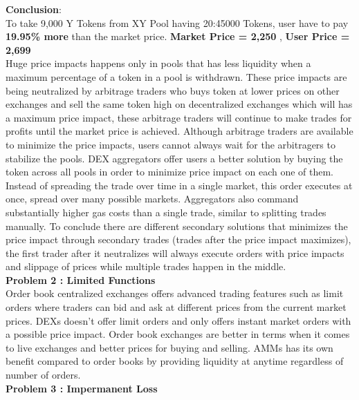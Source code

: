 \documentclass[conference]{IEEEtran}
\begin{document}
\textbf{Conclusion}:\\

To take 9,000 Y Tokens from XY Pool having 20:45000 Tokens, user have to pay \textbf{19.95\% more} than the market price. \textbf{Market Price = 2,250} , \textbf{User Price = 2,699}\\


Huge price impacts happens only in pools that has less liquidity when a maximum percentage of a token in a pool is withdrawn. These price impacts are being neutralized by arbitrage traders who buys token at lower prices on other exchanges and sell the same token high on decentralized exchanges which will has a maximum price impact, these arbitrage traders will continue to make trades for profits until the market price is achieved. Although arbitrage traders are available to minimize the price impacts, users cannot always wait for the arbitragers to stabilize the pools. DEX aggregators offer users a better solution by buying the token across all pools in order to minimize price impact on each one of them. Instead of spreading the trade over time in a single market, this order executes at once, spread over many possible markets. Aggregators also command substantially higher gas costs than a single trade, similar to splitting trades manually. To conclude there are different secondary solutions that minimizes the price impact through secondary trades (trades after the price impact maximizes), the first trader after it neutralizes will always execute orders with price impacts and slippage of prices while multiple trades happen in the middle.\\

\textbf{Problem 2 : Limited Functions}\\

Order book centralized exchanges offers advanced trading features such as limit orders where traders can bid and ask at different prices from the current market prices. DEXs doesn't offer limit orders and only offers instant market orders with a possible price impact. Order book exchanges are better in terms when it comes to live exchanges and better prices for buying and selling. AMMs has its own benefit compared to order books by providing liquidity at anytime regardless of number of orders.\\

\textbf{Problem 3 : Impermanent Loss}\\
\end{document}
